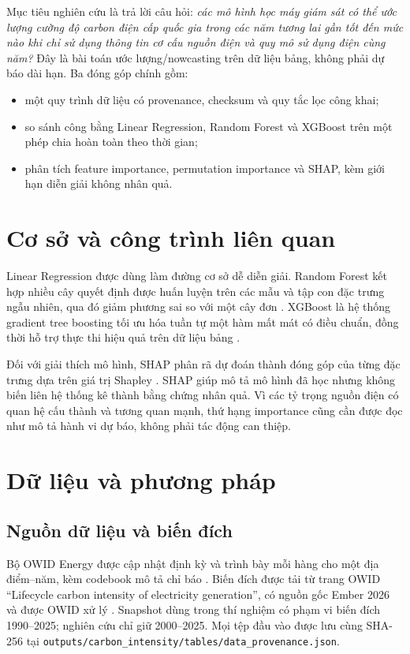 \documentclass[11pt,a4paper]{article}
\begin{document}
Mục tiêu nghiên cứu là trả lời câu hỏi: \emph{các mô hình học máy giám sát có
thể ước lượng cường độ carbon điện cấp quốc gia trong các năm tương lai gần tốt
đến mức nào khi chỉ sử dụng thông tin cơ cấu nguồn điện và quy mô sử dụng điện
cùng năm?} Đây là bài toán ước lượng/nowcasting trên dữ liệu bảng, không phải dự
báo dài hạn. Ba đóng góp chính gồm:

\begin{itemize}
  \item một quy trình dữ liệu có provenance, checksum và quy tắc lọc công khai;
  \item so sánh công bằng Linear Regression, Random Forest và XGBoost trên một
  phép chia hoàn toàn theo thời gian;
  \item phân tích feature importance, permutation importance và SHAP, kèm giới
  hạn diễn giải không nhân quả.
\end{itemize}

\section{Cơ sở và công trình liên quan}

Linear Regression được dùng làm đường cơ sở dễ diễn giải. Random Forest kết hợp
nhiều cây quyết định được huấn luyện trên các mẫu và tập con đặc trưng ngẫu
nhiên, qua đó giảm phương sai so với một cây đơn \cite{breiman2001}. XGBoost là
hệ thống gradient tree boosting tối ưu hóa tuần tự một hàm mất mát có điều
chuẩn, đồng thời hỗ trợ thực thi hiệu quả trên dữ liệu bảng \cite{chen2016}.

Đối với giải thích mô hình, SHAP phân rã dự đoán thành đóng góp của từng đặc
trưng dựa trên giá trị Shapley \cite{lundberg2017}. SHAP giúp mô tả mô hình đã
học nhưng không biến liên hệ thống kê thành bằng chứng nhân quả. Vì các tỷ trọng
nguồn điện có quan hệ cấu thành và tương quan mạnh, thứ hạng importance cũng cần
được đọc như mô tả hành vi dự báo, không phải tác động can thiệp.

\section{Dữ liệu và phương pháp}

\subsection{Nguồn dữ liệu và biến đích}

Bộ OWID Energy được cập nhật định kỳ và trình bày mỗi hàng cho một địa điểm--năm,
kèm codebook mô tả chỉ báo \cite{owid-energy-data}. Biến đích được tải từ trang
OWID ``Lifecycle carbon intensity of electricity generation'', có nguồn gốc
Ember 2026 và được OWID xử lý \cite{owid-carbon-intensity,ember-methodology}.
Snapshot dùng trong thí nghiệm có phạm vi biến đích 1990--2025; nghiên cứu chỉ
giữ 2000--2025. Mọi tệp đầu vào được lưu cùng SHA-256 tại
\texttt{outputs/carbon\_intensity/tables/data\_provenance.json}.
\end{document}
